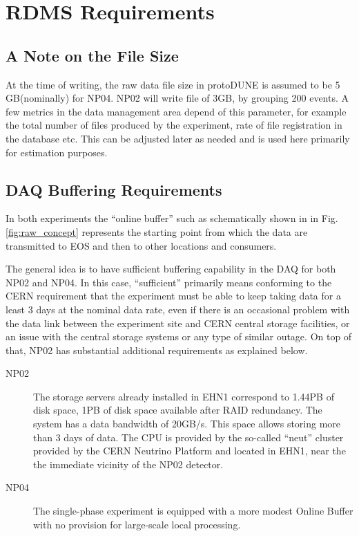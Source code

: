 \documentclass[12pt]{article}
\newcommand{\filesize}{5\,GB\xspace}
\begin{document}


\section{RDMS Requirements}
\subsection{A Note on the File Size}
At the time of writing, the raw data file size in protoDUNE  is assumed to be \filesize (nominally) for NP04.
NP02 will write file of 3GB, by grouping 200 events. A few metrics in the data management area depend of this
parameter, for example the total number of files produced by the experiment, rate of file registration in the database etc. This can be adjusted
later as needed and is used here primarily for estimation purposes.

\subsection{DAQ Buffering Requirements}
\label{sec:daq_interface}
In both experiments the ``online buffer'' such as schematically shown in in Fig.\ref{fig:raw_concept} represents the starting
point from which the data are transmitted to EOS and then to other locations and consumers.

The general idea is to have sufficient buffering capability in the DAQ for both NP02 and NP04. In this case, ``sufficient''
primarily means conforming to the CERN requirement that the experiment must be able to keep taking data for a
least 3 days at the nominal data rate, even if there is an occasional problem with the data link between the
experiment site and CERN central storage facilities, or an issue with the central storage systems or any type of similar outage.
On top of that, NP02 has substantial additional requirements as explained below.
\begin{description}

\item[NP02] The storage servers already installed in EHN1  correspond to 1.44PB of disk space, 1PB of disk space available after RAID redundancy.
The system has a data bandwidth of 20GB/s.
This space allows storing more than 3 days of data.
The CPU is provided by the so-called ``neut'' cluster provided by the CERN Neutrino Platform and located in EHN1, near the the immediate vicinity of the NP02 detector.

\item[ NP04] The single-phase experiment is equipped with a more modest Online Buffer with no provision for large-scale
local processing.
\end{description}
\end{document}
